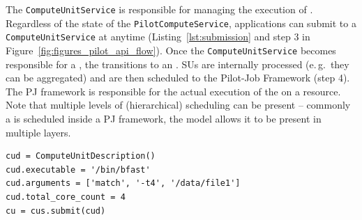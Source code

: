 \documentclass[conference]{IEEEtran}
\begin{document}

The \texttt{Compute\-Unit\-Service} is responsible for managing the execution of
\cus.
Regardless of the state of the \texttt{Pilot\-Compute\-Service}, applications can submit \cus to a
\texttt{Compute\-Unit\-Service} at anytime (Listing~\ref{lst:submission} and step 3
in Figure~\ref{fig:figures_pilot_api_flow}). 
Once the \texttt{Compute\-Unit\-Service} becomes responsible for a \cu, the \cu
transitions to an \su.
SUs are internally processed (e.\,g.\ they can be aggregated) and are then scheduled to the Pilot-Job Framework (step 4). 
The PJ framework is responsible for the actual execution of the \su on a
resource.
Note that multiple levels of (hierarchical) scheduling can be present -- commonly
a \su is scheduled inside a PJ framework, the model allows it to be present
in multiple layers.\\

\begin{minipage}{0.45 \textwidth}
\begin{lstlisting}[caption={\I{Instantiation and 
	submission of a \texttt{Compute\-Unit\-Description}.}}, label={lst:submission}] 
cud = ComputeUnitDescription()
cud.executable = '/bin/bfast'
cud.arguments = ['match', '-t4', '/data/file1']
cud.total_core_count = 4
cu = cus.submit(cud)
\end{lstlisting}
\end{minipage}



\end{document}
